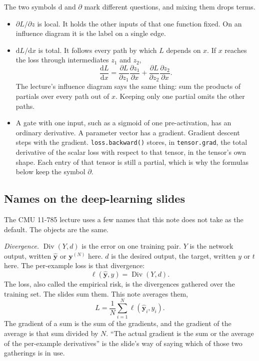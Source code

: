 \documentclass[11pt]{article}
\begin{document}
The two symbols $\mathrm{d}$ and $\partial$ mark different questions, and mixing them drops terms.
\begin{itemize}
\item $\partial L/\partial z$ is local. It holds the other inputs of that one function fixed. On an influence diagram it is the label on a single edge.
\item $\mathrm{d}L/\mathrm{d}x$ is total. It follows every path by which $L$ depends on $x$. If $x$ reaches the loss through intermediates $z_1$ and $z_2$,
\begin{equation}
\frac{\mathrm{d}L}{\mathrm{d}x}
=
\frac{\partial L}{\partial z_1}\frac{\partial z_1}{\partial x}
+
\frac{\partial L}{\partial z_2}\frac{\partial z_2}{\partial x}.
\label{eq:paths}
\end{equation}
The lecture's influence diagram says the same thing: sum the products of partials over every path out of $x$. Keeping only one partial omits the other paths.
\item A gate with one input, such as a sigmoid of one pre-activation, has an ordinary derivative. A parameter vector has a gradient. Gradient descent steps with the gradient. \texttt{loss.backward()} stores, in \texttt{tensor.grad}, the total derivative of the scalar loss with respect to that tensor, in the tensor's own shape. Each entry of that tensor is still a partial, which is why the formulas below keep the symbol $\partial$.
\end{itemize}

\subsection{Names on the deep-learning slides}

The CMU 11-785 lecture uses a few names that this note does not take as the default. The objects are the same.

\emph{Divergence.} $\operatorname{Div}(Y,d)$ is the error on one training pair. $Y$ is the network output, written $\hat{\mathbf{y}}$ or $\mathbf{y}^{(N)}$ here. $d$ is the desired output, the target, written $y$ or $t$ here. The per-example loss is that divergence:
\begin{equation}
\ell(\hat{\mathbf{y}},y)=\operatorname{Div}(Y,d).
\end{equation}
The loss, also called the empirical risk, is the divergences gathered over the training set. The slides sum them. This note averages them,
\begin{equation}
L=\frac{1}{N}\sum_{i=1}^{N}\ell(\hat{\mathbf{y}}_i,y_i).
\end{equation}
The gradient of a sum is the sum of the gradients, and the gradient of the average is that sum divided by $N$. ``The actual gradient is the sum or the average of the per-example derivatives'' is the slide's way of saying which of those two gatherings is in use.
\end{document}
